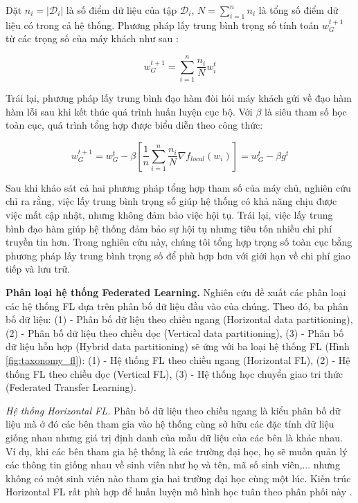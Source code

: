Đặt $n_i = |\mathcal{D}_i|$ là số điểm dữ liệu của tập $\mathcal{D}_i$, $N = \sum_{i=1}^n{n_i}$ là tổng số điểm dữ liệu có trong cả hệ thống. Phương pháp lấy trung bình trọng số tính toán $w_G^{t+1}$ từ các trọng số của máy khách như sau \cite{mcmahan2017communication}:

\begin{equation}
    \label{eq:agg_w}
    w_G^{t+1} = \sum_{i=1}^n{\frac{n_i}{N} w_i^t}
\end{equation}

Trái lại, phương pháp lấy trung bình đạo hàm đòi hỏi máy khách gửi về đạo hàm hàm lỗi sau khi kết thúc quá trình huấn luyện cục bộ. Với $\beta$ là siêu tham số học toàn cục, quá trình tổng hợp được biểu diễn theo công thức:

\begin{dmath}
    w_G^{t+1} = w_G^t - \beta \left[ \frac{1}{n} \sum_{i=1}^n{\frac{n_i}{N} \nabla f_{local}(w_i)} \right]
        = w_G^t - \beta g^t
\end{dmath}

Sau khi khảo sát cả hai phương pháp tổng hợp tham số của máy chủ, nghiên cứu \cite{yin2021comprehensive} chỉ ra rằng, việc lấy trung bình trọng số giúp hệ thống có khả năng chịu được việc mất cập nhật, nhưng không đảm bảo việc hội tụ. Trái lại, việc lấy trung bình đạo hàm giúp hệ thống đảm bảo sự hội tụ nhưng tiêu tốn nhiều chi phí truyền tin hơn. Trong nghiên cứu này, chúng tôi tổng hợp trọng số toàn cục bằng phương pháp lấy trung bình trọng số để phù hợp hơn với giới hạn về chi phí giao tiếp và lưu trữ.

\textbf{Phân loại hệ thống Federated Learning.} Nghiên cứu \cite{yin2021comprehensive} đề xuất các phân loại các hệ thống FL dựa trên phân bố dữ liệu đầu vào của chúng. Theo đó, ba phân bố dữ liệu: (1) - Phân bố dữ liệu theo chiều ngang (Horizontal data partitioning), (2) - Phân bố dữ liệu theo chiều dọc (Vertical data partitioning), (3) - Phân bố dữ liệu hỗn hợp (Hybrid data partitioning) sẽ ứng với ba loại hệ thống FL (Hình \ref{fig:taxonomy_fl}): (1) - Hệ thống FL theo chiều ngang (Horizontal FL), (2) - Hệ thống FL theo chiều dọc (Vertical FL), (3) - Hệ thống học chuyển giao tri thức (Federated Transfer Learning).

\textit{Hệ thống Horizontal FL.} Phân bố dữ liệu theo chiều ngang là kiểu phân bố dữ liệu mà ở đó các bên tham gia vào hệ thống cùng sở hữu các đặc tính dữ liệu giống nhau nhưng giá trị định danh của mẫu dữ liệu của các bên là khác nhau. Ví dụ, khi các bên tham gia hệ thống là các trường đại học, họ sẽ muốn quản lý các thông tin giống nhau về sinh viên như họ và tên, mã số sinh viên,... nhưng không có một sinh viên nào tham gia hai trường đại học cùng một lúc. Kiến trúc Horizontal FL rất phù hợp để huấn luyện mô hình học tuân theo phân phối này \cite{yin2021comprehensive}.

